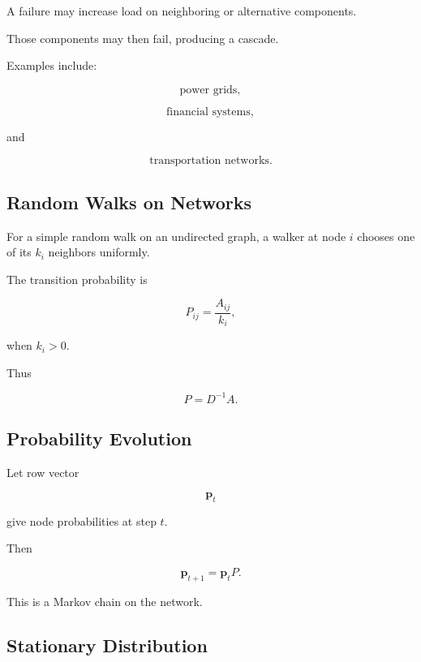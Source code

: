 A failure may increase load on neighboring or alternative components.

Those components may then fail, producing a cascade.

Examples include:

\[
\boxed{
\text{power grids},
}
\]

\[
\boxed{
\text{financial systems},
}
\]

and

\[
\boxed{
\text{transportation networks}.
}
\]

\subsection{Random Walks on Networks}
\label{subsec:random-walks-networks}

For a simple random walk on an undirected graph, a walker at node \(i\)
chooses one of its \(k_i\) neighbors uniformly.

The transition probability is

\[
\boxed{
P_{ij}
=
\frac{A_{ij}}
{k_i},
}
\]

when \(k_i>0\).

Thus

\[
\boxed{
P=D^{-1}A.
}
\]

\subsection{Probability Evolution}
\label{subsec:network-random-walk-evolution}

Let row vector

\[
\mathbf{p}_t
\]

give node probabilities at step \(t\).

Then

\[
\boxed{
\mathbf{p}_{t+1}
=
\mathbf{p}_tP.
}
\]

This is a Markov chain on the network.

\subsection{Stationary Distribution}
\label{subsec:network-stationary-distribution}

